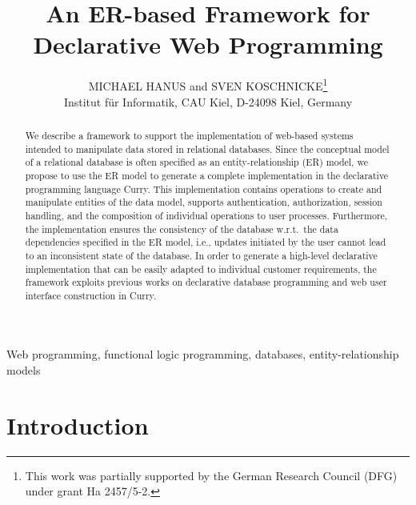 \documentclass{tlp}
\begin{document}
\sloppy

\title[An ER-based Framework for Declarative Web Programming]
 {An ER-based Framework for\\ Declarative Web Programming}

\author[M. Hanus and S. Koschnicke]
       {MICHAEL HANUS and SVEN KOSCHNICKE\thanks{This work was partially supported by the
   German Research Council (DFG) under grant Ha 2457/5-2.}\\
        Institut f\"ur Informatik, CAU Kiel, D-24098 Kiel, Germany \\
        }

\maketitle

\begin{abstract}
We describe a framework to support the implementation
of web-based systems intended to manipulate data stored in relational
databases. Since the conceptual model of a relational database
is often specified as an entity-relationship (ER) model,
we propose to use the ER model to generate
a complete implementation in the declarative programming language
Curry. This implementation contains operations to create and
manipulate entities of the data model, supports authentication,
authorization, session handling, and the composition of
individual operations to user processes.
Furthermore, the implementation ensures
the consistency of the database w.r.t.\ the data dependencies
specified in the ER model, i.e., updates initiated by the user
cannot lead to an inconsistent state of the database.
In order to generate a high-level declarative implementation
that can be easily adapted to individual customer requirements,
the framework exploits previous works on declarative
database programming and web user interface construction in Curry.
\end{abstract}

\begin{keywords}
Web programming, functional logic programming, databases,
entity-relationship models
\end{keywords}


\section{Introduction}
\end{document}
